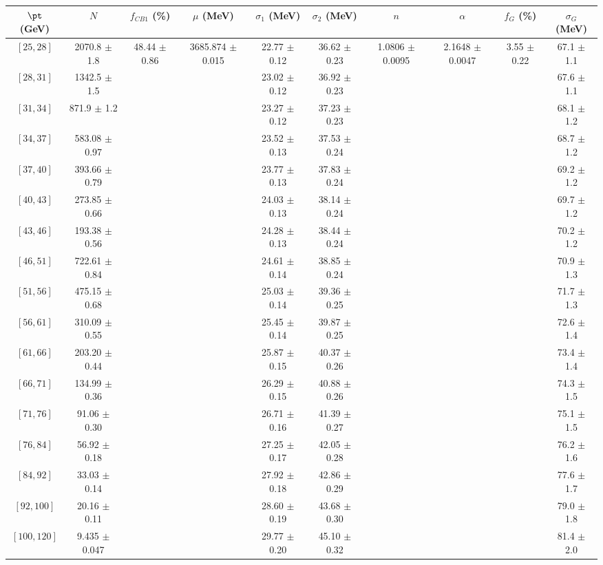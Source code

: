 \begin{tabular}{c||c|c|c|c|c|c|c|c|c}
$\pt$ (GeV) & $N$ & $f_{CB1}$ (\%)  & $\mu$ (MeV) & $\sigma_1$ (MeV) & $\sigma_2$ (MeV) & $n$ & $\alpha$ & $f_G$ (\%) & $\sigma_G$ (MeV) \\
\hline
$[25, 28]$ & 2070.8 $\pm$ 1.8 & \multirow{17}{*}{48.44 $\pm$ 0.86} & \multirow{17}{*}{3685.874 $\pm$ 0.015} & 22.77 $\pm$ 0.12 & 36.62 $\pm$ 0.23 & \multirow{17}{*}{1.0806 $\pm$ 0.0095} & \multirow{17}{*}{2.1648 $\pm$ 0.0047} & \multirow{17}{*}{3.55 $\pm$ 0.22} & 67.1 $\pm$ 1.1\\
$[28, 31]$ & 1342.5 $\pm$ 1.5 &  &  & 23.02 $\pm$ 0.12 & 36.92 $\pm$ 0.23 &  &  &  & 67.6 $\pm$ 1.1\\
$[31, 34]$ & 871.9 $\pm$ 1.2 &  &  & 23.27 $\pm$ 0.12 & 37.23 $\pm$ 0.23 &  &  &  & 68.1 $\pm$ 1.2\\
$[34, 37]$ & 583.08 $\pm$ 0.97 &  &  & 23.52 $\pm$ 0.13 & 37.53 $\pm$ 0.24 &  &  &  & 68.7 $\pm$ 1.2\\
$[37, 40]$ & 393.66 $\pm$ 0.79 &  &  & 23.77 $\pm$ 0.13 & 37.83 $\pm$ 0.24 &  &  &  & 69.2 $\pm$ 1.2\\
$[40, 43]$ & 273.85 $\pm$ 0.66 &  &  & 24.03 $\pm$ 0.13 & 38.14 $\pm$ 0.24 &  &  &  & 69.7 $\pm$ 1.2\\
$[43, 46]$ & 193.38 $\pm$ 0.56 &  &  & 24.28 $\pm$ 0.13 & 38.44 $\pm$ 0.24 &  &  &  & 70.2 $\pm$ 1.2\\
$[46, 51]$ & 722.61 $\pm$ 0.84 &  &  & 24.61 $\pm$ 0.14 & 38.85 $\pm$ 0.24 &  &  &  & 70.9 $\pm$ 1.3\\
$[51, 56]$ & 475.15 $\pm$ 0.68 &  &  & 25.03 $\pm$ 0.14 & 39.36 $\pm$ 0.25 &  &  &  & 71.7 $\pm$ 1.3\\
$[56, 61]$ & 310.09 $\pm$ 0.55 &  &  & 25.45 $\pm$ 0.14 & 39.87 $\pm$ 0.25 &  &  &  & 72.6 $\pm$ 1.4\\
$[61, 66]$ & 203.20 $\pm$ 0.44 &  &  & 25.87 $\pm$ 0.15 & 40.37 $\pm$ 0.26 &  &  &  & 73.4 $\pm$ 1.4\\
$[66, 71]$ & 134.99 $\pm$ 0.36 &  &  & 26.29 $\pm$ 0.15 & 40.88 $\pm$ 0.26 &  &  &  & 74.3 $\pm$ 1.5\\
$[71, 76]$ & 91.06 $\pm$ 0.30 &  &  & 26.71 $\pm$ 0.16 & 41.39 $\pm$ 0.27 &  &  &  & 75.1 $\pm$ 1.5\\
$[76, 84]$ & 56.92 $\pm$ 0.18 &  &  & 27.25 $\pm$ 0.17 & 42.05 $\pm$ 0.28 &  &  &  & 76.2 $\pm$ 1.6\\
$[84, 92]$ & 33.03 $\pm$ 0.14 &  &  & 27.92 $\pm$ 0.18 & 42.86 $\pm$ 0.29 &  &  &  & 77.6 $\pm$ 1.7\\
$[92, 100]$ & 20.16 $\pm$ 0.11 &  &  & 28.60 $\pm$ 0.19 & 43.68 $\pm$ 0.30 &  &  &  & 79.0 $\pm$ 1.8\\
$[100, 120]$ & 9.435 $\pm$ 0.047 &  &  & 29.77 $\pm$ 0.20 & 45.10 $\pm$ 0.32 &  &  &  & 81.4 $\pm$ 2.0\\
\end{tabular}
